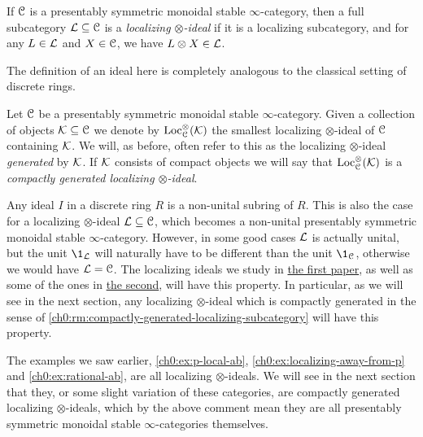 \begin{definition}
    \label{ch0:def:localizing-ideal}
    If $\EuScript{C}$ is a presentably symmetric monoidal stable $\infty$-category, then a full subcategory $\mathcal{L}\subseteq \EuScript{C}$ is a \emph{localizing $\otimes$-ideal} if it is a localizing subcategory, and for any $L\in \mathcal{L}$ and $X\in \EuScript{C}$, we have $L\otimes X\in \mathcal{L}$. 
\end{definition}

The definition of an ideal here is completely analogous to the classical setting of discrete rings. 

\begin{definition}
    Let $\EuScript{C}$ be a presentably symmetric monoidal stable $\infty$-category. Given a collection of objects $\mathcal{K}\subseteq \EuScript{C}$ we denote by $\operatorname{Loc}_{\EuScript{C}}^\otimes(\mathcal{K})$ the smallest localizing $\otimes$-ideal of $\EuScript{C}$ containing $\mathcal{K}$. We will, as before, often refer to this as the localizing $\otimes$-ideal \emph{generated} by $\mathcal{K}$. If $\mathcal{K}$ consists of compact objects we will say that $\operatorname{Loc}^\otimes_{\EuScript{C}}(\mathcal{K})$ is a \emph{compactly generated localizing $\otimes$-ideal}. 
\end{definition}

Any ideal $I$ in a discrete ring $R$ is a non-unital subring of $R$. This is also the case for a localizing $\otimes$-ideal $\mathcal{L}\subseteq \EuScript{C}$, which becomes a non-unital presentably symmetric monoidal stable $\infty$-category. However, in some good cases $\mathcal{L}$ is actually unital, but the unit $\1_\L$ will naturally have to be different than the unit $\1_\C$, otherwise we would have $\mathcal{L}=\EuScript{C}$. The localizing ideals we study in \hyperref[ch1]{the first paper}, as well as some of the ones in \hyperref[ch2]{the second}, will have this property. In particular, as we will see in the next section, any localizing $\otimes$-ideal which is compactly generated in the sense of \cref{ch0:rm:compactly-generated-localizing-subcategory} will have this property.

\begin{example}
    The examples we saw earlier, \cref{ch0:ex:p-local-ab}, \cref{ch0:ex:localizing-away-from-p} and \cref{ch0:ex:rational-ab}, are all localizing $\otimes$-ideals. We will see in the next section that they, or some slight variation of these categories, are compactly generated localizing $\otimes$-ideals, which by the above comment mean they are all presentably symmetric monoidal stable $\infty$-categories themselves. 
\end{example}





